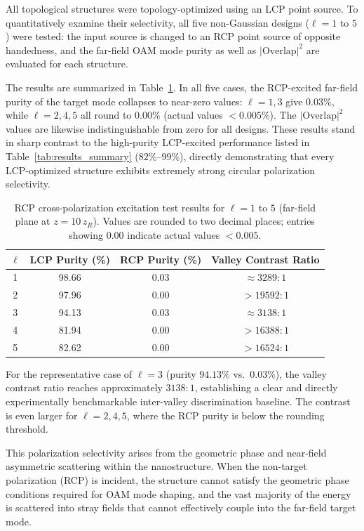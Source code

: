 All topological structures were topology-optimized using an LCP point source. To quantitatively examine their selectivity, all five non-Gaussian designs ($\ell = 1$ to $5$) were tested: the input source is changed to an RCP point source of opposite handedness, and the far-field OAM mode purity as well as $|\text{Overlap}|^2$ are evaluated for each structure.

The results are summarized in Table~\ref{tab:rcp_selectivity}. In all five cases, the RCP-excited far-field purity of the target mode collapses to near-zero values: $\ell = 1, 3$ give $0.03\%$, while $\ell = 2, 4, 5$ all round to $0.00\%$ (actual values $< 0.005\%$). The $|\text{Overlap}|^2$ values are likewise indistinguishable from zero for all designs. These results stand in sharp contrast to the high-purity LCP-excited performance listed in Table~\ref{tab:results_summary} ($82\%$--$99\%$), directly demonstrating that every LCP-optimized structure exhibits extremely strong circular polarization selectivity.

\begin{table}[htb]
\centering
\caption{RCP cross-polarization excitation test results for $\ell = 1$ to $5$ (far-field plane at $z = 10\,z_R$). Values are rounded to two decimal places; entries showing $0.00$ indicate actual values $< 0.005$.}
\label{tab:rcp_selectivity}
    \begin{tabular}{cccc}
        \hline
        $\ell$ & LCP Purity (\%) & RCP Purity (\%) & Valley Contrast Ratio\\
        \hline
        1 & 98.66 & 0.03 & $\approx 3289:1$\\
        2 & 97.96 & 0.00 & $> 19592:1$\\
        3 & 94.13 & 0.03 & $\approx 3138:1$\\
        4 & 81.94 & 0.00 & $> 16388:1$\\
        5 & 82.62 & 0.00 & $> 16524:1$\\
        \hline
    \end{tabular}
\end{table}

For the representative case of $\ell = 3$ (purity $94.13\%$ vs.\ $0.03\%$), the valley contrast ratio reaches approximately $3138:1$, establishing a clear and directly experimentally benchmarkable inter-valley discrimination baseline. The contrast is even larger for $\ell = 2, 4, 5$, where the RCP purity is below the rounding threshold.

This polarization selectivity arises from the geometric phase and near-field asymmetric scattering within the nanostructure. When the non-target polarization (RCP) is incident, the structure cannot satisfy the geometric phase conditions required for OAM mode shaping, and the vast majority of the energy is scattered into stray fields that cannot effectively couple into the far-field target mode.

